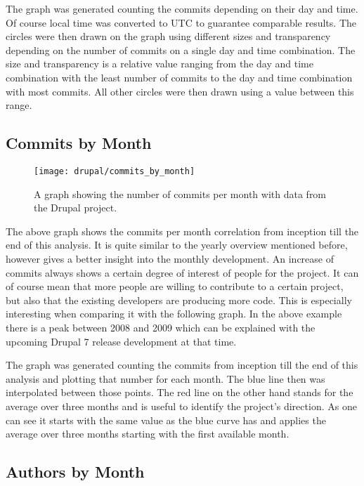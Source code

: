 The graph was generated counting the commits depending on their day and time.
Of course local time was converted to \ac{UTC} to guarantee comparable results.
The circles were then drawn on the graph using different sizes and transparency
depending on the number of commits on a single day and time combination. The
size and transparency is a relative value ranging from the day and time
combination with the least number of commits to the day and time combination
with most commits. All other circles were then drawn using a value between this
range.


\subsection{Commits by Month} %

\begin{figure}[h!t]
  \centering
  \texttt{[image: drupal/commits\_by\_month]}
  \caption[The commits by month graph]
  {A graph showing the number of commits per month with data from the Drupal
    project.}
\end{figure}

The above graph shows the commits per month correlation from inception till the
end of this analysis. It is quite similar to the yearly overview mentioned
before, however gives a better insight into the monthly development. An
increase of commits always shows a certain degree of interest of people for the
project. It can of course mean that more people are willing to contribute to a
certain project, but also that the existing developers are producing more code.
This is especially interesting when comparing it with the following graph. In
the above example there is a peak between 2008 and 2009 which can be explained
with the upcoming Drupal 7 release development at that time.

The graph was generated counting the commits from inception till the end of
this analysis and plotting that number for each month. The blue line then was
interpolated between those points. The red line on the other hand stands for
the average over three months and is useful to identify the project's
direction. As one can see it starts with the same value as the blue curve has
and applies the average over three months starting with the first available
month.


\subsection{Authors by Month} %

